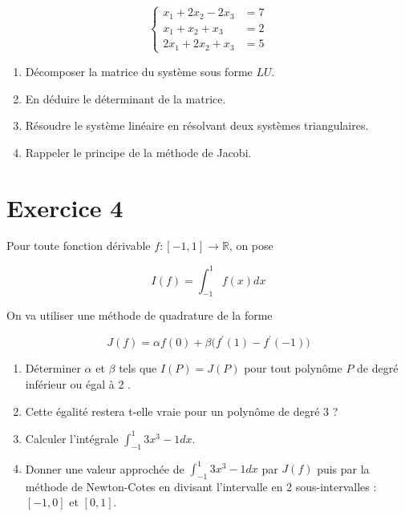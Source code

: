 \documentclass[10pt]{article}
\begin{document}
$$
\begin{cases}x_1+2 x_2-2 x_3 & =7 \\ x_1+x_2+x_3 & =2 \\ 2 x_1+2 x_2+x_3 & =5\end{cases}
$$

\begin{enumerate}
    \item Décomposer la matrice du système sous forme $L U$.
    \item En déduire le déterminant de la matrice. 
    \item Résoudre le système linéaire en résolvant deux systèmes triangulaires. 
    \item Rappeler le principe de la méthode de Jacobi.

\end{enumerate}


\vspace{1em}
\section*{Exercice 4}
Pour toute fonction dérivable $f:[-1,1] \longrightarrow \mathbb{R}$, on pose

$$
I(f)=\int_{-1}^1 f(x) d x
$$


On va utiliser une méthode de quadrature de la forme

$$
J(f)=\alpha f(0)+\beta\big(f^{\prime}(1)-f^{\prime}(-1)\big)
$$

\begin{enumerate}
    \item Déterminer $\alpha$ et $\beta$ tels que $I(P)=J(P)$ pour tout polynôme $P$ de degré inférieur ou égal à 2 .
    \item Cette égalité restera t-elle vraie pour un polynôme de degré 3 ?
    \item Calculer l'intégrale $\int_{-1}^1 3 x^3-1 d x$.
    \item Donner une valeur approchée de $\int_{-1}^1 3 x^3-1 d x$ par $J(f)$ puis par la méthode de Newton-Cotes en divisant l'intervalle en 2 sous-intervalles : $[-1,0]$ et $[0,1]$.
\end{enumerate}

\vspace{1em}
\end{document}
